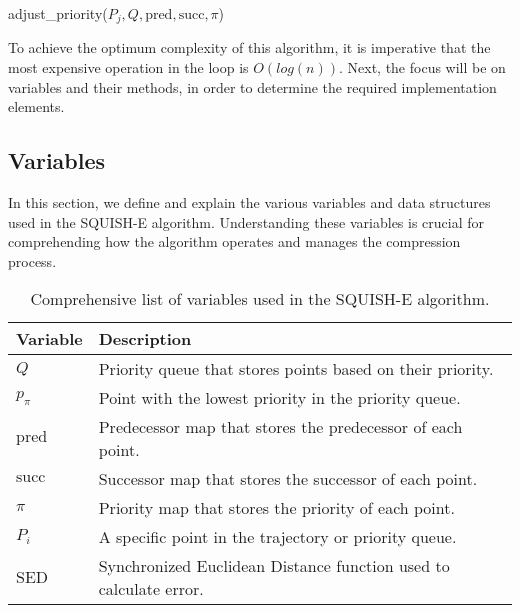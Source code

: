 \begin{algorithm}[H]
    \DontPrintSemicolon


    \caption{adjust\_priority($P_j, Q, \text{pred}, \text{succ}, \pi$)}
    \label{alg:adjust_priority}
\end{algorithm}


To achieve the optimum complexity of this algorithm, it is imperative that the most expensive operation in the loop is $O(log(n))$. Next, the focus will be on variables and their methods, in order to determine the required implementation elements.

\subsection{Variables}

In this section, we define and explain the various variables and data structures used in the SQUISH-E algorithm. Understanding these variables is crucial for comprehending how the algorithm operates and manages the compression process.

\begin{table}[h!]
    \centering
    \label{tab:variables}
    \begin{tabular}{ll}
        \hline
        \textbf{Variable} & \textbf{Description} \\
        \hline
        $Q$             & Priority queue that stores points based on their priority. \\
        $p_{\pi}$       & Point with the lowest priority in the priority queue. \\
        $\text{pred}$   & Predecessor map that stores the predecessor of each point. \\
        $\text{succ}$   & Successor map that stores the successor of each point. \\
        $\pi$           & Priority map that stores the priority of each point. \\
        $P_i$           & A specific point in the trajectory or priority queue. \\
        $\text{SED}$    & Synchronized Euclidean Distance function used to calculate error. \\
        \hline
    \end{tabular}
    \caption{Comprehensive list of variables used in the SQUISH-E algorithm.}
\end{table}


